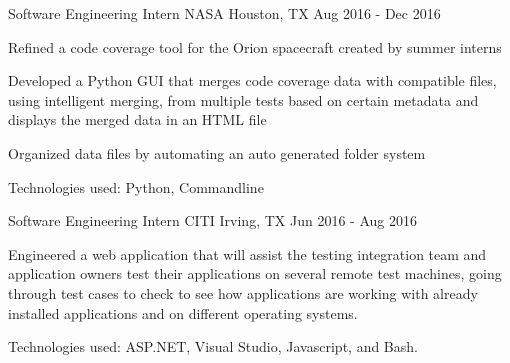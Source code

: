 \begin{cventries}
  \cventry
    {Software Engineering Intern} %
    {NASA} %
    {Houston, TX} %
    {Aug 2016 - Dec 2016} %
    {
      \begin{cvitems} %
        \item {Refined a code coverage tool for the Orion spacecraft created by summer interns }
        \item {Developed a Python GUI that merges code coverage data with compatible files, using intelligent merging, from multiple tests based on certain metadata and displays the merged data in an HTML file}
        \item {Organized data files by automating an auto generated folder system}
        \item {Technologies used: Python, Commandline}
      \end{cvitems}
    }

  \cventry
    {Software Engineering Intern} %
    {CITI} %
    {Irving, TX} %
    {Jun 2016 - Aug 2016} %
    {
      \begin{cvitems} %
        \item {Engineered a web application that will assist the testing integration team and application owners test their applications on several remote test machines, going through test cases to check to see how applications are working with already installed applications and on different operating systems. }
        \item {Technologies used: ASP.NET, Visual Studio, Javascript, and Bash. }
      \end{cvitems}
    }

\end{cventries}
